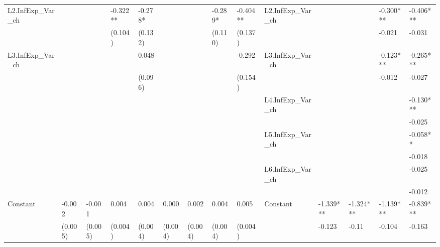 \documentclass[]{article}
\begin{document}
\begin{adjustbox}{width={22cm},totalheight={12cm},angle=90}
\begin{tabular}{llllllllllllll}
		L2.InfExp\_Var\_ch   &             &           & -0.322**  & -0.278*   &               &           & -0.289*   & -0.404**  & L2.InfExp\_Var\_ch   &               &           & -0.300*** & -0.406*** \\
		&             &           & (0.104)   & (0.132)   &               &           & (0.110)   & (0.137)   &                      &               &           & -0.021    & -0.031    \\
		L3.InfExp\_Var\_ch   &             &           &           & 0.048     &               &           &           & -0.292    & L3.InfExp\_Var\_ch   &               &           & -0.123*** & -0.265*** \\
		&             &           &           & (0.096)   &               &           &           & (0.154)   &                      &               &           & -0.012    & -0.027    \\
		&             &           &           &           &               &           &           &           & L4.InfExp\_Var\_ch   &               &           &           & -0.130*** \\
		&             &           &           &           &               &           &           &           &                      &               &           &           & -0.025    \\
		&             &           &           &           &               &           &           &           & L5.InfExp\_Var\_ch   &               &           &           & -0.058**  \\
		&             &           &           &           &               &           &           &           &                      &               &           &           & -0.018    \\
		&             &           &           &           &               &           &           &           & L6.InfExp\_Var\_ch   &               &           &           & -0.025    \\
		&             &           &           &           &               &           &           &           &                      &               &           &           & -0.012    \\
		Constant               & -0.002      & -0.001    & 0.004     & 0.004     & 0.000         & 0.002     & 0.004     & 0.005     &   Constant                   & -1.339***     & -1.324*** & -1.139*** & -0.839*** \\
		& (0.005)     & (0.005)   & (0.004)   & (0.004)   & (0.004)       & (0.004)   & (0.004)   & (0.004)   &                      & -0.123        & -0.11     & -0.104    & -0.163    \\

\end{tabular}
\end{adjustbox}
\end{document}
